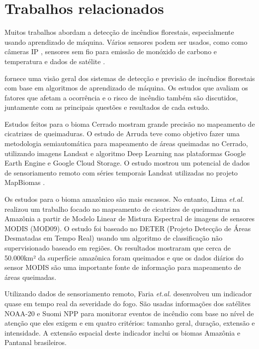 \chapter{Trabalhos relacionados}
\label{relacionados}


Muitos trabalhos abordam a detecção de incêndios florestais, especialmente usando aprendizado de máquina. Vários sensores podem ser usados, como
como câmeras IP \cite{forest-fire-ip-camera}, sensores sem fio para emissão de monóxido de carbono e temperatura \cite{forest-fire-detection-wireless-sensor} e dados de satélite \cite{queimadas_cerrado}.

\cite{Abid2021} fornece uma visão geral dos sistemas de detecção e previsão de incêndios florestais com base em algoritmos de aprendizado de máquina.
Os estudos que avaliam os fatores que afetam a ocorrência e o risco de incêndio também são discutidos, juntamente com as principais questões e resultados de cada estudo.

Estudos feitos para o bioma Cerrado mostram grande precisão no mapeamento de cicatrizes de queimaduras. O estudo de Arruda \cite{UNBVera} teve como objetivo fazer uma metodologia semiautomática para mapeamento de áreas queimadas no Cerrado, utilizando imagens Landsat e algoritmo Deep Learning nas plataformas Google Earth Engine e Google Cloud Storage. O estudo mostrou um potencial de dados de sensoriamento remoto com séries temporais Landsat utilizadas no projeto MapBiomas \cite{MapBiomasQueimadas}.

Os estudos para o bioma amazônico são mais escassos. No entanto, Lima \textit{et.al.} \cite{ModisGiovanna} realizou um trabalho focado no mapeamento de cicatrizes de queimaduras na Amazônia a partir de Modelo Linear de Mistura Espectral de imagens de sensores MODIS (MOD09). O estudo foi baseado no DETER (Projeto Detecção de Áreas Desmatadas em Tempo Real) \cite{deter} usando um algoritmo de classificação não supervisionado baseado em regiões. Os resultados mostraram que cerca de 50.000km² da superfície amazônica foram queimados e que os dados diários do sensor MODIS são uma importante fonte de informação para mapeamento de áreas queimadas.

Utilizando dados de sensoriamento remoto, Faria \textit{et.al.} \cite{severidade-do-fogo} desenvolveu um indicador quase em tempo real da severidade do fogo. São usadas informações dos satélites NOAA-20 e Suomi NPP para monitorar eventos de incêndio com base no nível de atenção que eles exigem e em quatro critérios: tamanho geral, duração, extensão e intensidade. A extensão espacial deste indicador inclui os biomas Amazônia e Pantanal brasileiros.

